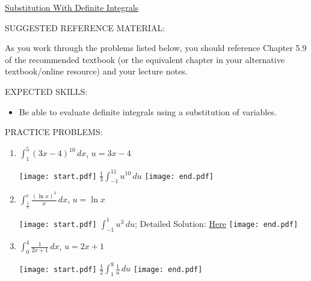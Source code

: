 \documentclass[12pt]{article}
\begin{document}
\begin{center}
\underline{\LARGE{Substitution With Definite Integrals}}
\end{center}

\noindent SUGGESTED REFERENCE MATERIAL:

\bigskip

\noindent As you work through the problems listed below, you should reference Chapter 5.9 of the recommended textbook (or the equivalent chapter in your alternative textbook/online resource) and your lecture notes.

\bigskip


\noindent EXPECTED SKILLS:

\begin{itemize}

\item Be able to evaluate definite integrals using a substitution of variables.

\end{itemize}

\noindent PRACTICE PROBLEMS:

\medskip


\begin{enumerate}

\item $\int_1^5 (3x-4)^{10} \,dx$, $u=3x-4$

\texttt{[image: start.pdf]}
{{$\frac{1}{3}\int_{-1}^{11} u^{10} \,du$}}
\texttt{[image: end.pdf]}


\item $\int_{\frac{1}{e}}^{e} \frac{(\ln{x})^3}{x} \,dx$, $u=\ln{x}$

\texttt{[image: start.pdf]}
{{$\int_{-1}^1 u^3 \,du$; Detailed Solution: \textcolor{blue}{\href{http://www.math.drexel.edu/classes/Calculus/resources/Math122HW/Solutions/122_06_Substitution_Definite_02.pdf}{Here}}}}
\texttt{[image: end.pdf]}


\item $\int_0^4 \frac{1}{2x+1} \,dx$, $u=2x+1$

\texttt{[image: start.pdf]}
{{$\frac{1}{2} \int_1^9 \frac{1}{u} \,du$}}
\texttt{[image: end.pdf]}


\end{enumerate}
\end{document}
